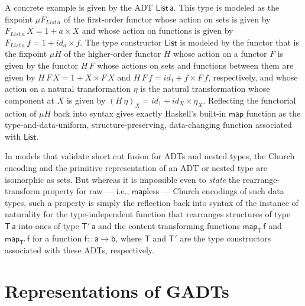 \documentclass[acmsmall,screen,review,anonymous]{acmart}
\theoremstyle{definition}
\renewcommand{\id}{\mathit{id}}
\begin{document}
A concrete example is given by the ADT $\mathsf{List\,a}$. This type
is modeled as the fixpoint $\mu F_{\mathit{List\,a}}$ of the
first-order functor whose action on sets is given by
$F_{\mathit{List}\,a}\,X = 1 + a \times X$ and whose action on
functions is given by $F_{\mathit{List}\,a}\,f = 1 + \id_a \times
f$. The type constructor $\mathsf{List}$ is modeled by the functor
that is the fixpoint $\mu H$ of the higher-order functor $H$ whose
action on a functor $F$ is given by the functor $H\,F$ whose actions
on sets and functions between them are given by $H\,F\,X = 1 + X
\times F\,X$ and $H\,F\,f = \id_1 + f \times F\,f$, respectively, and
whose action on a natural transformation $\eta$ is the natural
transformation whose component at $X$ is given by $(H\,\eta)_X = \id_1
+ \id_X \times \eta_X$. Reflecting the functorial action of $\mu H$
back into syntax gives exactly Haskell's built-in $\mathsf{map}$
function as the type-and-data-uniform, structure-preserving,
data-changing function associated with $\mathsf{List}$.

\vspace*{0.05in}

In models that validate short cut fusion for ADTs and nested types,
the Church encoding and the primitive representation of an ADT or
nested type are isomorphic as sets. But whereas it is impossible even
to {\em state} the rearrange-transform property for {\color{blue} raw
  --- i.e., $\mathsf{map}$less ---} Church encodings of such data
types, such a property is simply the reflection back into syntax of
the instance of naturality for the type-independent function that
rearranges structures of type $\mathsf{T\,a}$ into ones of type
$\mathsf{T'\,a}$ and the content-transforming functions
$\mathsf{map_T\,f}$ and $\mathsf{map_{T'}\,f}$ for a function
$\mathsf{f :: a \to b}$, where $\mathsf{T}$ and $\mathsf{T'}$ are the
type constructors associated with these ADTs, respectively.

\section{Representations of GADTs}\label{sec:gadts}
\end{document}
